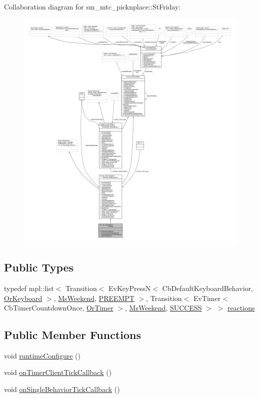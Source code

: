 Collaboration diagram for sm\+\_\+mtc\+\_\+picknplace\+:\+:St\+Friday\+:
\nopagebreak
\begin{figure}[H]
\begin{center}
\leavevmode
\includegraphics[width=350pt]{structsm__mtc__picknplace_1_1StFriday__coll__graph}
\end{center}
\end{figure}
\subsection*{Public Types}
\begin{DoxyCompactItemize}
\item 
typedef mpl\+::list$<$ Transition$<$ Ev\+Key\+PressN$<$ Cb\+Default\+Keyboard\+Behavior, \hyperlink{classsm__mtc__picknplace_1_1OrKeyboard}{Or\+Keyboard} $>$, \hyperlink{classsm__mtc__picknplace_1_1MsWeekend}{Ms\+Weekend}, \hyperlink{classPREEMPT}{P\+R\+E\+E\+M\+PT} $>$, Transition$<$ Ev\+Timer$<$ Cb\+Timer\+Countdown\+Once, \hyperlink{classsm__mtc__picknplace_1_1OrTimer}{Or\+Timer} $>$, \hyperlink{classsm__mtc__picknplace_1_1MsWeekend}{Ms\+Weekend}, \hyperlink{classSUCCESS}{S\+U\+C\+C\+E\+SS} $>$ $>$ \hyperlink{structsm__mtc__picknplace_1_1StFriday_a36ad8453803378c192bc8f3fa0cf2fad}{reactions}
\end{DoxyCompactItemize}
\subsection*{Public Member Functions}
\begin{DoxyCompactItemize}
\item 
void \hyperlink{structsm__mtc__picknplace_1_1StFriday_ab1bbd74287b06a89073f6e5d802c9cf0}{runtime\+Configure} ()
\item 
void \hyperlink{structsm__mtc__picknplace_1_1StFriday_a2e6580832b81439e2e5bed6cc45775e1}{on\+Timer\+Client\+Tick\+Callback} ()
\item 
void \hyperlink{structsm__mtc__picknplace_1_1StFriday_a75c9cded6d1bf23f4f7b6dfbde8d4502}{on\+Single\+Behavior\+Tick\+Callback} ()
\end{DoxyCompactItemize}
